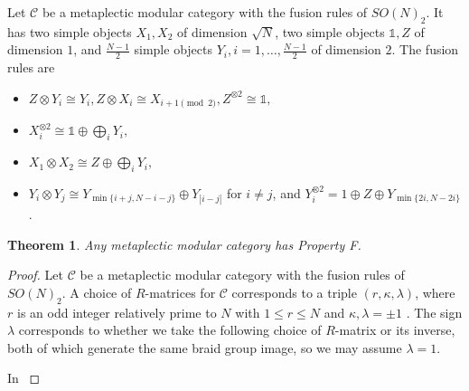 \documentclass{amsart}
\newtheorem{thm}{Theorem}[section]
\newcommand{\one}{\mathbb{1}}
\begin{document}
Let $\mathcal{C}$ be a metaplectic modular category with the fusion rules of $SO(N)_2$.  It has two simple objects $X_1, X_2$ of dimension $\sqrt{N}$, two simple objects $\one, Z$ of dimension $1$, and $\frac{N-1}{2}$ simple objects $Y_i, i = 1, \ldots, \frac{N-1}{2}$ of dimension $2$.  The fusion rules are
\begin{itemize}
\item $Z \otimes Y_i \cong Y_i, Z \otimes X_i \cong X_{i+1 \pmod{2}} , Z^{\otimes 2} \cong \one,$
\item $X_i^{\otimes 2} \cong \one \oplus \bigoplus_i Y_i,$
\item $X_1 \otimes X_2 \cong Z \oplus \bigoplus_i Y_i,$ 
\item $Y_i \otimes Y_j \cong Y_{\min\{i+j, N - i -j\}} \oplus Y_{|i - j|}$ for $i \neq j$, and $Y_i^{\otimes 2} = 1 \oplus Z \oplus Y_{\min\{2i, N - 2i\}}$.
\end{itemize}

\newcommand{\ZZ}{\mathbf{Z}}

\begin{thm}
Any metaplectic modular category has Property F.
\end{thm}
\begin{proof}
Let $\mathcal{C}$ be a metaplectic modular category with the fusion rules of $SO(N)_2$. A choice of $R$-matrices for $\mathcal{C}$ corresponds to a triple  $(r, \kappa, \lambda)$, where $r$ is an odd integer relatively prime to $N$ with $1 \le r \le N$ and $\kappa, \lambda = \pm 1$ \cite{metaClass2}.  The sign $\lambda$ corresponds to whether we take the following choice of $R$-matrix or its inverse, both of which generate the same braid group image, so we may assume $\lambda = 1$.  

In  \cite{Gaussian}

\end{proof}



\end{document}
